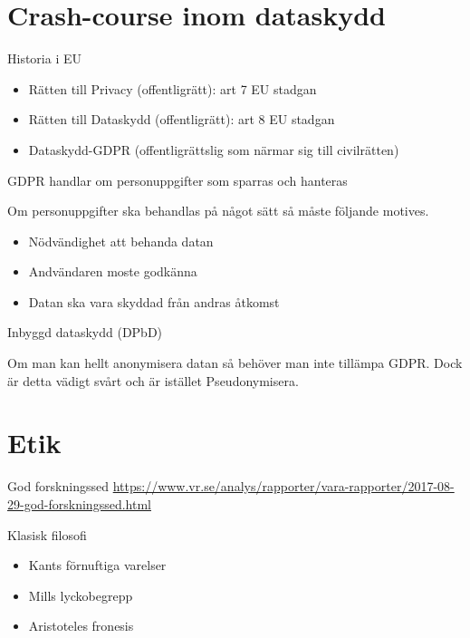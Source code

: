 \section{Crash-course inom dataskydd}
Historia i EU
\begin{itemize}
\item Rätten till Privacy (offentligrätt): art 7 EU stadgan
\item Rätten till Dataskydd (offentligrätt): art 8 EU stadgan
\item Dataskydd-GDPR (offentligrättslig som närmar sig till civilrätten)
\end{itemize}

GDPR handlar om personuppgifter som sparras och hanteras

Om personuppgifter ska behandlas på något sätt så måste följande motives.
\begin{itemize}
\item Nödvändighet att behanda datan
\item Andvändaren moste godkänna
\item Datan ska vara skyddad från andras åtkomst
\end{itemize}

Inbyggd dataskydd (DPbD)

Om man kan hellt anonymisera datan så behöver man inte tillämpa GDPR. Dock är detta vädigt svårt och är istället Pseudonymisera.

%
%
%
%    
%
%
%
%


\section{Etik}
God forskningssed
\url{https://www.vr.se/analys/rapporter/vara-rapporter/2017-08-29-god-forskningssed.html}

Klasisk filosofi
\begin{itemize}
\item Kants förnuftiga varelser
\item Mills lyckobegrepp
\item Aristoteles fronesis
\end{itemize}

